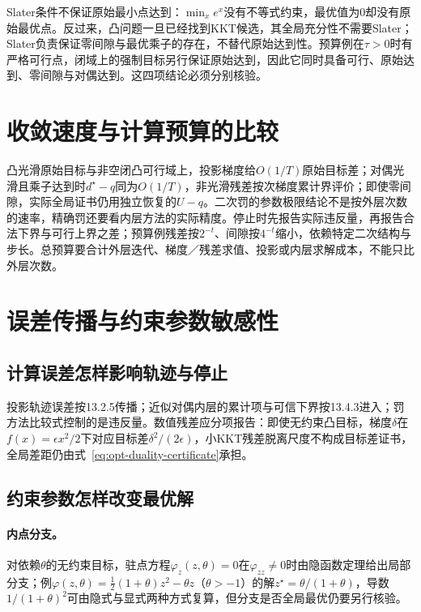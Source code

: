 Slater条件不保证原始最小点达到：$\min_x e^x$没有不等式约束，最优值为$0$却没有原始最优点。反过来，凸问题一旦已经找到KKT候选，其全局充分性不需要Slater；Slater负责保证零间隙与最优乘子的存在，不替代原始达到性。预算例在$\tau>0$时有严格可行点，闭域上的强制目标另行保证原始达到，因此它同时具备可行、原始达到、零间隙与对偶达到。这四项结论必须分别核验。

\section{收敛速度与计算预算的比较}

凸光滑原始目标与非空闭凸可行域上，投影梯度给$O(1/T)$原始目标差；对偶光滑且乘子达到时$d^\star-q$同为$O(1/T)$，非光滑残差按次梯度累计界评价；即使零间隙，实际全局证书仍用独立恢复的$U-q$。二次罚的参数极限结论不是按外层次数的速率，精确罚还要看内层方法的实际精度。停止时先报告实际违反量，再报告合法下界与可行上界之差；预算例残差按$2^{-t}$、间隙按$4^{-t}$缩小，依赖特定二次结构与步长。总预算要合计外层迭代、梯度／残差求值、投影或内层求解成本，不能只比外层次数。

\section{误差传播与约束参数敏感性}

\subsection{计算误差怎样影响轨迹与停止}

投影轨迹误差按13.2.5传播；近似对偶内层的累计项与可信下界按13.4.3进入；罚方法比较式控制的是违反量。数值残差应分项报告：即使无约束凸目标，梯度$\delta$在$f(x)=\epsilon x^2/2$下对应目标差$\delta^2/(2\epsilon)$，小KKT残差脱离尺度不构成目标差证书，全局差距仍由式~\eqref{eq:opt-duality-certificate}承担。

\subsection{约束参数怎样改变最优解}

\paragraph{内点分支。}
对依赖$\theta$的无约束目标，驻点方程$\varphi_z(z,\theta)=0$在$\varphi_{zz}\neq0$时由隐函数定理给出局部分支；例$\varphi(z,\theta)=\frac12(1+\theta)z^2-\theta z$（$\theta>-1$）的解$z^\star=\theta/(1+\theta)$，导数$1/(1+\theta)^2$可由隐式与显式两种方式复算，但分支是否全局最优仍要另行核验。

